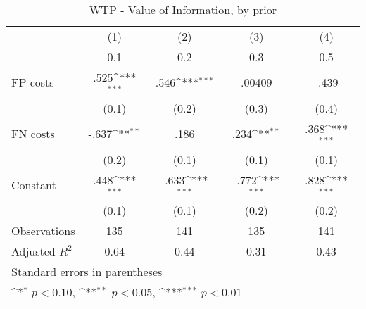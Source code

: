 \begin{table}[htbp]\centering
\def\sym#1{\ifmmode^{#1}\else\(^{#1}\)\fi}
\caption{WTP - Value of Information, by prior}
\begin{tabular}{l*{4}{c}}
\hline\hline
                &\multicolumn{1}{c}{(1)}&\multicolumn{1}{c}{(2)}&\multicolumn{1}{c}{(3)}&\multicolumn{1}{c}{(4)}\\
                &\multicolumn{1}{c}{0.1}&\multicolumn{1}{c}{0.2}&\multicolumn{1}{c}{0.3}&\multicolumn{1}{c}{0.5}\\
\hline
FP costs        &     .525\sym{***}&     .546\sym{***}&   .00409         &    -.439         \\
                &    (0.1)         &    (0.2)         &    (0.3)         &    (0.4)         \\
FN costs        &    -.637\sym{**} &     .186         &     .234\sym{**} &     .368\sym{***}\\
                &    (0.2)         &    (0.1)         &    (0.1)         &    (0.1)         \\
Constant        &     .448\sym{***}&    -.633\sym{***}&    -.772\sym{***}&     .828\sym{***}\\
                &    (0.1)         &    (0.1)         &    (0.2)         &    (0.2)         \\
\hline
Observations    &      135         &      141         &      135         &      141         \\
Adjusted \(R^{2}\)&     0.64         &     0.44         &     0.31         &     0.43         \\
\hline\hline
\multicolumn{5}{l}{\footnotesize Standard errors in parentheses}\\
\multicolumn{5}{l}{\footnotesize \sym{*} \(p<0.10\), \sym{**} \(p<0.05\), \sym{***} \(p<0.01\)}\\
\end{tabular}
\end{table}

